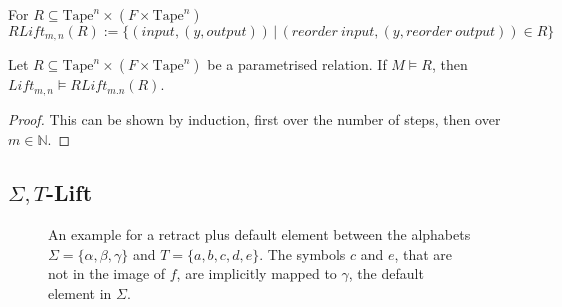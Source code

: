 \documentclass{psartcl}
\newcommand{\setOf}[1]{\bigl \{ #1 \bigr \}}
\newcommand{\setMap}[2]{\setOf{#1 \,\big|\, #2}}
\newcommand{\Nat}{\mathbb{N}}
\newcommand{\Tape}{\txt{Tape}}
\newcommand{\Tapes}[1]{\Tape^{#1}}
\newcommand{\Tau}{T}
\newcommand{\txt}[1]{\text{#1}}
\begin{document}
\begin{definition}
  \label{def:m,n-rellift}
  For $R \subseteq \Tapes{n} \times (F \times \Tapes{n})$
  $$RLift_{m,n}(R) := \setMap{(input, (y, output))}{(reorder~input, (y, reorder~output)) \in R}$$
\end{definition}

\begin{lemma}
  \label{lem:m,n-correctness}
  Let $R \subseteq \Tapes{n} \times (F \times \Tapes{n})$ be a parametrised relation.  If $M \vDash R$, then $Lift_{m,n} \vDash RLift_{m.n}(R)$.
\end{lemma}
\begin{proof}
  This can be shown by induction, first over the number of steps, then over $m \in \Nat$.
\end{proof}


\subsection{\texorpdfstring{$\Sigma,\Tau$}{Sigma,Tau}-Lift}

\begin{figure}
  \center
  \caption{An example for a retract plus default element between the alphabets $\Sigma = \setOf{\alpha, \beta, \gamma}$ and $\Tau =
  \setOf{a,b,c,d,e}$.  The symbols $c$ and $e$, that are not in the image of $f$, are implicitly mapped to $\gamma$, the default element in $\Sigma$.}
  \label{fig:sigma-tau-lift-example-mapping}
\end{figure}
\end{document}
